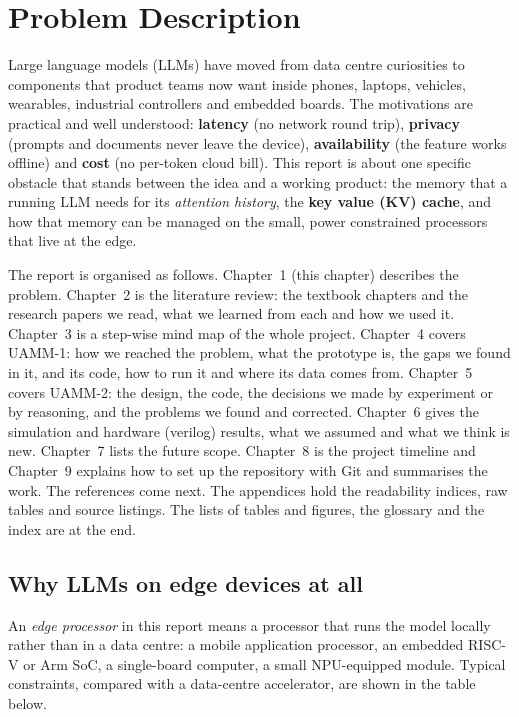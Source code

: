 \documentclass[12pt,a4paper]{report}
\begin{document}
\clearpage
\tableofcontents\clearpage
{}
\chapter{Problem Description}
Large language models (LLMs) have moved from data centre curiosities to components that product teams now want inside phones, laptops, vehicles, wearables, industrial controllers and embedded boards. The motivations are practical and well understood: \textbf{latency} (no network round trip), \textbf{privacy} (prompts and documents never leave the device), \textbf{availability} (the feature works offline) and \textbf{cost} (no per-token cloud bill). This report is about one specific obstacle that stands between the idea and a working product: the memory that a running LLM needs for its \textit{attention history}, the \textbf{key value (KV) cache}, and how that memory can be managed on the small, power constrained processors that live at the edge.

The report is organised as follows. Chapter~1 (this chapter) describes the problem. Chapter~2 is the literature review: the textbook chapters and the research papers we read, what we learned from each and how we used it. Chapter~3 is a step-wise mind map of the whole project. Chapter~4 covers UAMM-1: how we reached the problem, what the prototype is, the gaps we found in it, and its code, how to run it and where its data comes from. Chapter~5 covers UAMM-2: the design, the code, the decisions we made by experiment or by reasoning, and the problems we found and corrected. Chapter~6 gives the simulation and hardware (verilog) results, what we assumed and what we think is new. Chapter~7 lists the future scope. Chapter~8 is the project timeline and Chapter~9 explains how to set up the repository with Git and summarises the work. The references come next. The appendices hold the readability indices, raw tables and source listings. The lists of tables and figures, the glossary and the index are at the end.

\section{Why LLMs on edge devices at all}\label{sec:1_1}
An \textit{edge processor} in this report means a processor that runs the model locally rather than in a data centre: a mobile application processor, an embedded RISC-V or Arm SoC, a single-board computer, a small NPU-equipped module. Typical constraints, compared with a data-centre accelerator, are shown in the table below.
\end{document}

